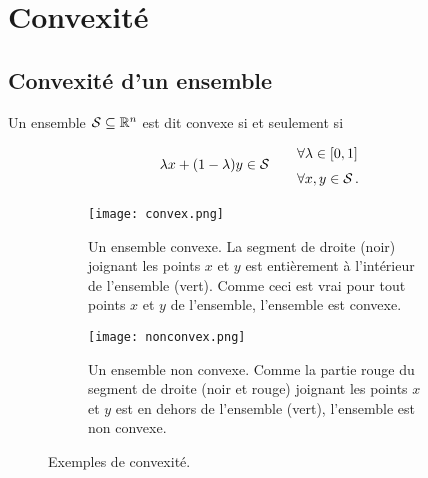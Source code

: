 \section{Convexité}

\subsection{Convexité d'un ensemble}

	\begin{mydef}
		Un ensemble $\mathcal{S} \subseteq \mathbb{R}^n$ est dit convexe
		si et seulement si
		\[
		\renewcommand{\arraystretch}{1.5}
		\begin{tabular}{c@{\qquad}l}
			\multirow{2}{*}{$\lambda x + (1 - \lambda)y \in \mathcal{S}$}
			& $\forall \lambda \in \interval{0}{1}$\\
			& $\forall x,y \in \mathcal{S}$\,.
		\end{tabular}
		\]

		\begin{figure}[H]
		\begin{subfigure}[t]{.45\linewidth}
		\centering
		\texttt{[image: convex.png]}
		\caption{Un ensemble convexe.
		La segment de droite (noir) joignant les points $x$ et $y$
		est entièrement à l'intérieur de l'ensemble (vert).
		Comme ceci est vrai pour tout points $x$ et $y$ de l'ensemble,
		l'ensemble est convexe.}\label{fig:convex_set}
		\end{subfigure}%
		\hfill
		\begin{subfigure}[t]{.45\linewidth}
		\centering
		\texttt{[image: nonconvex.png]}
		\caption{Un ensemble non convexe.
		Comme la partie rouge du segment de droite (noir et rouge)
		joignant les points $x$ et $y$
		est en dehors de l'ensemble (vert),
		l'ensemble est non convexe.}\label{fig:nonconvex_set}
		\end{subfigure}
		\caption{Exemples de convexité.}\label{fig:convexity}
		\end{figure}
	\end{mydef}

